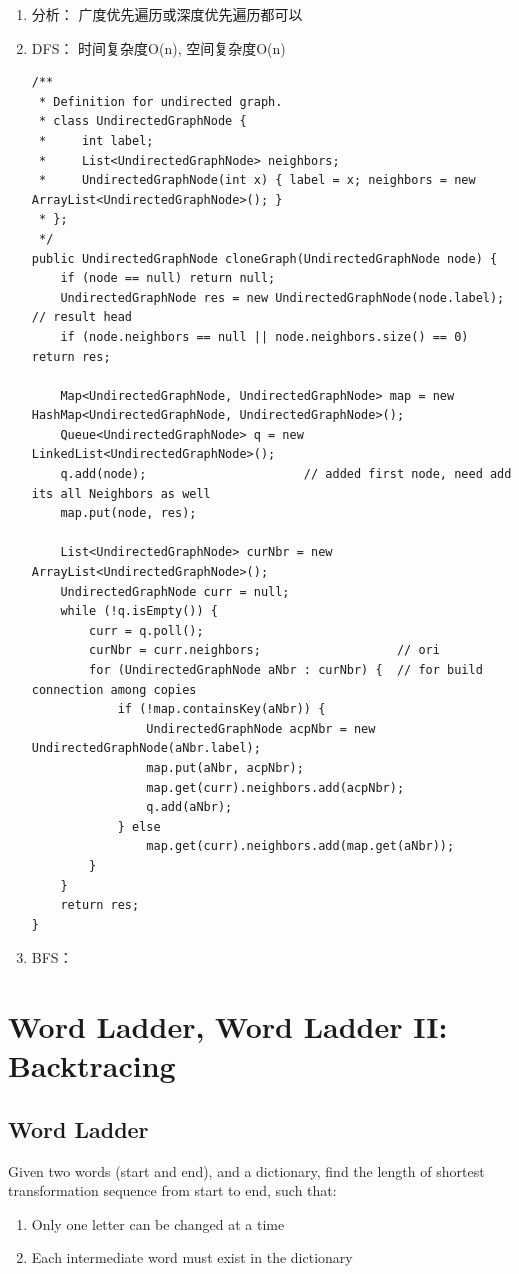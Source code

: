 \documentclass[12pt]{book}
\begin{document}
\begin{enumerate}
\item 分析： 广度优先遍历或深度优先遍历都可以
\label{sec-18-1-1-1}
\item DFS： 时间复杂度O(n), 空间复杂度O(n)
\label{sec-18-1-1-2}
\lstset{language=java,label= ,caption= ,numbers=none}
\begin{lstlisting}
/**
 * Definition for undirected graph.
 * class UndirectedGraphNode {
 *     int label;
 *     List<UndirectedGraphNode> neighbors;
 *     UndirectedGraphNode(int x) { label = x; neighbors = new ArrayList<UndirectedGraphNode>(); }
 * };
 */
public UndirectedGraphNode cloneGraph(UndirectedGraphNode node) {
    if (node == null) return null;
    UndirectedGraphNode res = new UndirectedGraphNode(node.label);  // result head
    if (node.neighbors == null || node.neighbors.size() == 0) return res;

    Map<UndirectedGraphNode, UndirectedGraphNode> map = new HashMap<UndirectedGraphNode, UndirectedGraphNode>();
    Queue<UndirectedGraphNode> q = new LinkedList<UndirectedGraphNode>();
    q.add(node);                      // added first node, need add its all Neighbors as well
    map.put(node, res);

    List<UndirectedGraphNode> curNbr = new ArrayList<UndirectedGraphNode>();
    UndirectedGraphNode curr = null;
    while (!q.isEmpty()) {
        curr = q.poll();
        curNbr = curr.neighbors;                   // ori
        for (UndirectedGraphNode aNbr : curNbr) {  // for build connection among copies
            if (!map.containsKey(aNbr)) {
                UndirectedGraphNode acpNbr = new UndirectedGraphNode(aNbr.label);
                map.put(aNbr, acpNbr);
                map.get(curr).neighbors.add(acpNbr);
                q.add(aNbr);
            } else
                map.get(curr).neighbors.add(map.get(aNbr));                        
        }
    }
    return res;
}
\end{lstlisting}
\item BFS：
\label{sec-18-1-1-3}
\end{enumerate}
\section{Word Ladder, Word Ladder II: Backtracing}
\label{sec-18-2}
\subsection{Word Ladder}
\label{sec-18-2-1}
Given two words (start and end), and a dictionary, find the length of shortest transformation sequence from start to end, such that:
\begin{enumerate}
\item Only one letter can be changed at a time
\item Each intermediate word must exist in the dictionary
\end{enumerate}
\end{document}
